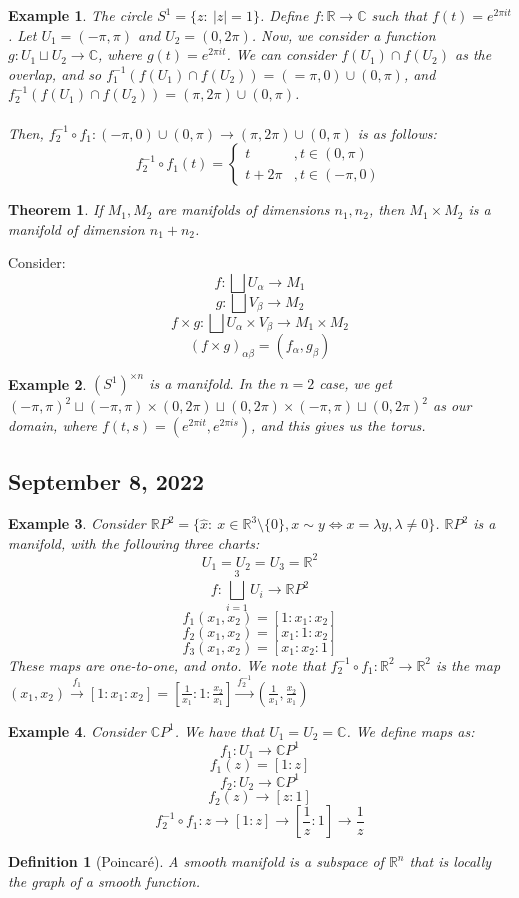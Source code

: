 \documentclass{article}
\newcommand{\R}{\mathbb{R}}
\newcommand{\C}{\mathbb{C}}
\newtheorem{theorem}{Theorem}
\newtheorem{example}{Example}
\newtheorem{definition}{Definition}
\begin{document}
\begin{example}
The circle $S^1=\{z:\ |z|=1\}$. Define $f:\R\rightarrow \C$ such that $f(t)=e^{2\pi it}$. Let $U_1=(-\pi, \pi)$ and $U_2=(0,2\pi)$. Now, we consider a function $g: U_1\sqcup U_2\rightarrow \C$, where $g(t)=e^{2\pi it}$. We can consider $f(U_1)\cap f(U_2)$ as the overlap, and so $f_1^{-1}(f(U_1)\cap f(U_2))=(=\pi,0)\cup (0,\pi)$, and $f_2^{-1}(f(U_1)\cap f(U_2))=(\pi,2\pi)\cup (0,\pi)$.\\
\\
Then, $f_2^{-1}\circ f_1 :(-\pi,0)\cup (0,\pi)\rightarrow (\pi,2\pi)\cup (0,\pi)$ is as follows:
\begin{equation*}
    f_2^{-1}\circ f_1(t)=\begin{cases}
    t &,t\in(0,\pi)\\
    t+2\pi &,t\in(-\pi,0)
    \end{cases}
\end{equation*}
\end{example}
\begin{theorem}
If $M_1,M_2$ are manifolds of dimensions $n_1, n_2$, then $M_1\times M_2$ is a manifold of dimension $n_1+n_2$.
\end{theorem}
 Consider:
 $$f:\bigsqcup U_\alpha\rightarrow M_1$$
 $$g:\bigsqcup V_\beta\rightarrow M_2$$
 $$f\times g:\bigsqcup U_\alpha\times V_\beta\rightarrow M_1\times M_2$$
 $$(f\times g)_{\alpha\beta}=(f_\alpha,g_\beta)$$
 \begin{example}
 $(S^1)^{\times n}$ is a manifold. In the $n=2$ case, we get $(-\pi, \pi)^2\sqcup (-\pi, \pi)\times (0,2\pi)\sqcup (0,2\pi)\times (-\pi,\pi)\sqcup (0,2\pi)^2$ as our domain, where $f(t,s)=(e^{2\pi it},e^{2\pi is})$, and this gives us the torus.
 \end{example}
 \newpage
 \subsection{September 8, 2022}
 \begin{example}
 Consider $\R P^2=\{\hat{x}:\ x\in\R^3\setminus \{0\},x\sim y\iff x=\lambda y, \lambda\neq 0\}$. $\R P^2$ is a manifold, with the following three charts:
 $$U_1=U_2=U_3=\R^2$$
 $$f: \displaystyle\bigsqcup_{i=1}^3 U_i\rightarrow \R P^2$$
 $$f_1(x_1,x_2)=[1:x_1:x_2]$$
 $$f_2(x_1,x_2)=[x_1:1:x_2]$$
 $$f_3(x_1,x_2)=[x_1:x_2:1]$$
 These maps are one-to-one, and onto. We note that $f_2^{-1}\circ f_1: \R^2\rightarrow \R^2$ is the map $(x_1,x_2)\xrightarrow{f_1} [1:x_1:x_2]=\left[\frac{1}{x_1}:1:\frac{x_2}{x_1}\right]\xrightarrow{f_2^{-1}}\left(\frac{1}{x_1},\frac{x_2}{x_1}\right)$
 \end{example}
 \begin{example}
 Consider $\C P^1$. We have that $U_1=U_2=\C$. We define maps as:
 $$f_1:U_1\rightarrow \C P^1$$
 $$f_1(z)=[1:z]$$
 $$f_2: U_2\rightarrow \C P^1$$
 $$f_2(z)\rightarrow [z:1]$$
 $$f_2^{-1}\circ f_1:z\rightarrow [1:z]\rightarrow \left[\frac{1}{z}:1\right]\rightarrow \frac{1}{z}$$
 \end{example}
 \begin{definition}[Poincar\'e]
 A smooth manifold is a subspace of $\R^n$ that is locally the graph of a smooth function.
 \end{definition}
 
\end{document}

